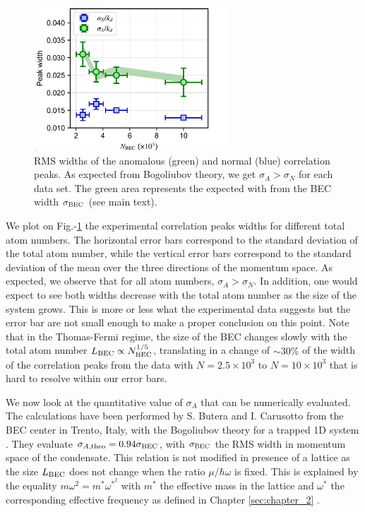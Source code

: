 \begin{figure}
    \centering
    \includegraphics[width=0.65\textwidth]{Fig/Chapter4/widths.png}
    \caption{RMS widths of the anomalous (green) and normal (blue) correlation peaks. As expected from Bogoliubov theory, we get $\sigma_A > \sigma_N$ for each data set. The green area represents the expected with from the BEC width $\sigma_{\rm{BEC}}$ (see main text).}
    \label{fig:width}
\end{figure}

We plot on Fig.-\ref{fig:width} the experimental correlation peaks widths for different total atom numbers. The horizontal error bars correspond to the standard deviation of the total atom number, while the vertical error bars correspond to the standard deviation of the mean over the three directions of the momentum space. As expected, we observe that for all atom numbers, $\sigma_A > \sigma_N$. In addition, one would expect to see both widths decrease with the total atom number as the size of the system grows. This is more or less what the experimental data suggests but the error bar are not small enough to make a proper conclusion on this point. Note that in the Thomas-Fermi regime, the size of the BEC changes slowly with the total atom number $L_{\rm{BEC}} \propto N_{\rm{BEC}}^{1/5}$, translating in a change of $\sim 30\%$ of the width of the correlation peaks from the data with $N=2.5 \times 10^3$ to $N=10 \times 10^3$ that is hard to resolve within our error bars.

We now look at the quantitative value of $\sigma_A$ that can be numerically evaluated. The calculations have been performed by S. Butera and I. Carusotto from the BEC center in Trento, Italy, with the Bogoliubov theory for a trapped 1D system \cite{butera2020}. They evaluate $\sigma_{A,\rm{theo}} = 0.94 \sigma_{\rm{BEC}}$, with $\sigma_{\rm{BEC}}$ the RMS width in momentum space of the condensate. This relation is not modified in presence of a lattice as the size $L_{\rm{BEC}}$ does not change when the ratio $\mu/\hbar \omega$ is fixed. This is explained by the equality $m \omega^2 = m^* \omega^* ^2$ with $m^*$ the effective mass in the lattice and $\omega^*$ the corresponding effective frequency as defined in Chapter \ref{sec:chapter_2} .

